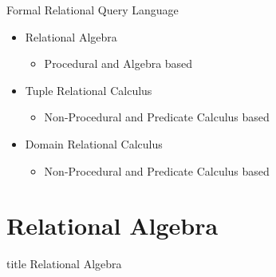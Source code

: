 \documentclass[aspectratio=169, xcolor=dvipsnames]{beamer}
\begin{document}
\begin{frame}{Formal Relational Query Language}
    \begin{itemize}[<+->]
        \item Relational Algebra
        \begin{itemize}
            \item[$\triangleright$] Procedural and Algebra based
        \end{itemize}
        \item Tuple Relational Calculus
        \begin{itemize}
            \item[$\triangleright$] Non-Procedural and Predicate Calculus based
        \end{itemize}
        \item Domain Relational Calculus
        \begin{itemize}
            \item[$\triangleright$] Non-Procedural and Predicate Calculus based
        \end{itemize}
    \end{itemize}
\end{frame}

\section{Relational Algebra}
\begin{frame}
  \vfill
  \centering
  \begin{beamercolorbox}[sep=8pt,center,shadow=true,rounded=true]{title}
    Relational Algebra\par%
  \end{beamercolorbox}
  \vfill
\end{frame}
\end{document}
